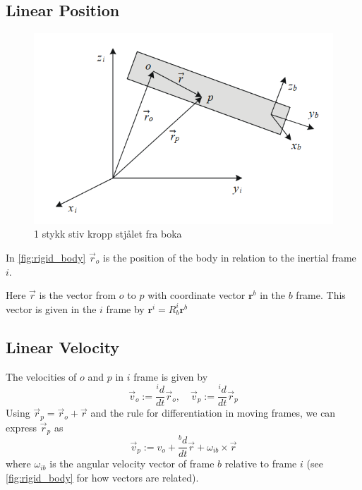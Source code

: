 
\subsection{Linear Position}
\begin{figure}[H]
    \centering
    \includegraphics[scale=0.6]{figures/Rigid body configuration.png}
    \caption{1 stykk stiv kropp stjålet fra boka}
    \label{fig:rigid_body}
\end{figure}

In \autoref{fig:rigid_body} $\vec r_o$ is the position of the body in relation to the inertial frame $i$. 

Here $\vec r$ is the vector from $o$ to $p$ with coordinate vector $\mathbf{r}^b$ in the $b$ frame. This vector is given in the $i$ frame by
$\mathbf{r}^i = R^i_b\mathbf{r}^b$

\subsection{Linear Velocity}
The velocities of $o$ and $p$ in $i$ frame is given by
$$
\vec{v}_o:=\frac{^id}{d t} \vec{r}_o, \quad \vec{v}_p:=\frac{^id}{d t} \vec{r}_p
$$
Using $\vec r_p=\vec r_o+\vec r$ and the rule for differentiation in moving frames, we can express $\vec r_p$ as
$$
\vec{v}_p:=v_o+\frac{^bd}{d t} \vec{r}+\omega_{ib}\times \vec r
$$
where $\omega_{ib}$ is the angular velocity vector of frame $b$ relative to frame $i$ (see \autoref{fig:rigid_body} for how vectors are related).


